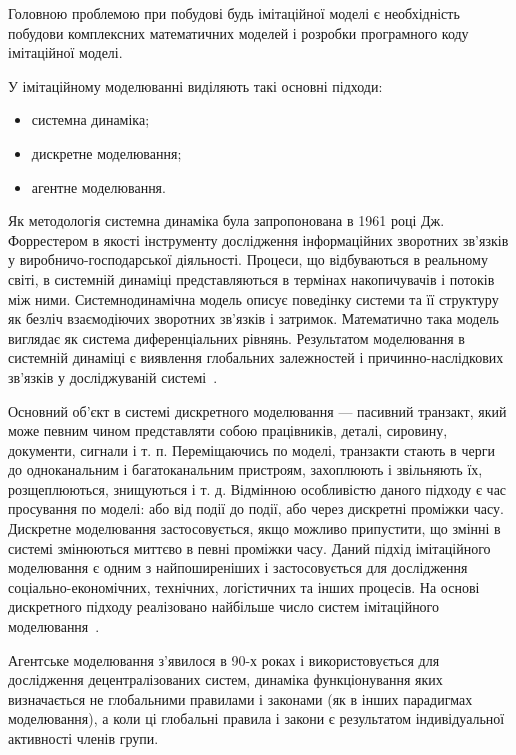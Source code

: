 Головною проблемою при побудові будь імітаційної моделі є необхідність побудови комплексних математичних моделей і розробки програмного коду імітаційної моделі. 

У імітаційному моделюванні виділяють такі основні підходи:
\begin{itemize}
	\item системна динаміка;
	\item дискретне моделювання;
	\item агентне моделювання.
\end{itemize}

Як методологія системна динаміка була запропонована в 1961 році Дж. Форрестером в якості інструменту дослідження інформаційних зворотних зв'язків у виробничо-господарської діяльності. 
Процеси, що відбуваються в реальному світі, в системній динаміці представляються в термінах накопичувачів і потоків між ними.
Системнодинамічна модель описує поведінку системи та її структуру як безліч взаємодіючих зворотних зв'язків і затримок. 
Математично така модель виглядає як система диференціальних рівнянь. 
Результатом моделювання в системній динаміці є виявлення глобальних залежностей і причинно-наслідкових зв'язків у досліджуваній системі~\cite{Shamrin2016}. 

Основний об'єкт в системі дискретного моделювання --- пасивний транзакт, який може певним чином представляти собою працівників, деталі, сировину, документи, сигнали і т. п.
Переміщаючись по моделі, транзакти стають в черги до одноканальним і багатоканальним пристроям, захоплюють і звільняють їх, розщеплюються, знищуються і т. д.
Відмінною особливістю даного підходу є час просування по моделі: або від події до події, або через дискретні проміжки часу. 
Дискретне моделювання застосовується, якщо можливо припустити, що змінні в системі змінюються миттєво в певні проміжки часу. 
Даний підхід імітаційного моделювання є одним з найпоширеніших і застосовується для дослідження соціально-економічних, технічних, логістичних та інших процесів.
На основі дискретного підходу реалізовано найбільше
число систем імітаційного моделювання~\cite{Shamrin2016}. 

Агентське моделювання з'явилося в 90-х роках і використовується для дослідження децентралізованих систем, динаміка функціонування яких визначається не глобальними правилами і законами (як в інших парадигмах моделювання), а коли ці глобальні правила і закони є результатом індивідуальної активності членів групи.

